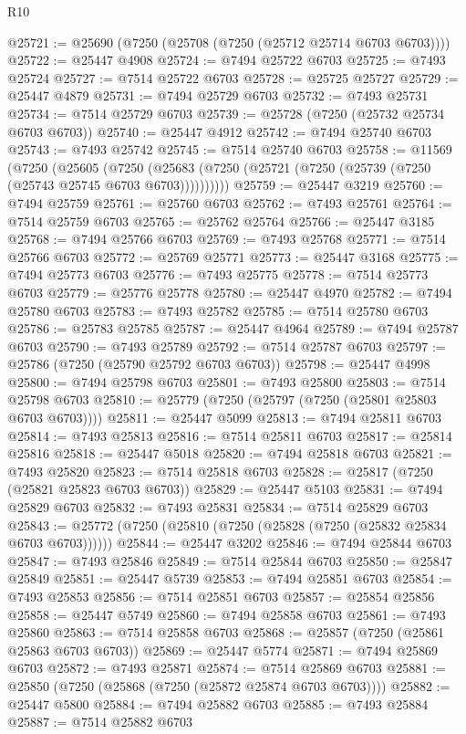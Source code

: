 \begin{lexlean}{R10}
\begin{coremodule}
{{{{{{{{{{{{{{{{{{{{{{{{{{{{{{{{{{{{{{{{{{{{{{{{{{{{{{{{{{{{{{{{{{{{{{{{{{{{{{{{{{{{@25721 := @25690 (@7250 (@25708 (@7250 (@25712 @25714 @6703 @6703))))
@25722 := @25447 @4908
@25724 := @7494 @25722 @6703
@25725 := @7493 @25724
@25727 := @7514 @25722 @6703
@25728 := @25725 @25727
@25729 := @25447 @4879
@25731 := @7494 @25729 @6703
@25732 := @7493 @25731
@25734 := @7514 @25729 @6703
@25739 := @25728 (@7250 (@25732 @25734 @6703 @6703))
@25740 := @25447 @4912
@25742 := @7494 @25740 @6703
@25743 := @7493 @25742
@25745 := @7514 @25740 @6703
@25758 := @11569
    (@7250
      (@25605
        (@7250 (@25683 (@7250 (@25721 (@7250 (@25739 (@7250 (@25743 @25745 @6703 @6703))))))))))
@25759 := @25447 @3219
@25760 := @7494 @25759
@25761 := @25760 @6703
@25762 := @7493 @25761
@25764 := @7514 @25759 @6703
@25765 := @25762 @25764
@25766 := @25447 @3185
@25768 := @7494 @25766 @6703
@25769 := @7493 @25768
@25771 := @7514 @25766 @6703
@25772 := @25769 @25771
@25773 := @25447 @3168
@25775 := @7494 @25773 @6703
@25776 := @7493 @25775
@25778 := @7514 @25773 @6703
@25779 := @25776 @25778
@25780 := @25447 @4970
@25782 := @7494 @25780 @6703
@25783 := @7493 @25782
@25785 := @7514 @25780 @6703
@25786 := @25783 @25785
@25787 := @25447 @4964
@25789 := @7494 @25787 @6703
@25790 := @7493 @25789
@25792 := @7514 @25787 @6703
@25797 := @25786 (@7250 (@25790 @25792 @6703 @6703))
@25798 := @25447 @4998
@25800 := @7494 @25798 @6703
@25801 := @7493 @25800
@25803 := @7514 @25798 @6703
@25810 := @25779 (@7250 (@25797 (@7250 (@25801 @25803 @6703 @6703))))
@25811 := @25447 @5099
@25813 := @7494 @25811 @6703
@25814 := @7493 @25813
@25816 := @7514 @25811 @6703
@25817 := @25814 @25816
@25818 := @25447 @5018
@25820 := @7494 @25818 @6703
@25821 := @7493 @25820
@25823 := @7514 @25818 @6703
@25828 := @25817 (@7250 (@25821 @25823 @6703 @6703))
@25829 := @25447 @5103
@25831 := @7494 @25829 @6703
@25832 := @7493 @25831
@25834 := @7514 @25829 @6703
@25843 := @25772 (@7250 (@25810 (@7250 (@25828 (@7250 (@25832 @25834 @6703 @6703))))))
@25844 := @25447 @3202
@25846 := @7494 @25844 @6703
@25847 := @7493 @25846
@25849 := @7514 @25844 @6703
@25850 := @25847 @25849
@25851 := @25447 @5739
@25853 := @7494 @25851 @6703
@25854 := @7493 @25853
@25856 := @7514 @25851 @6703
@25857 := @25854 @25856
@25858 := @25447 @5749
@25860 := @7494 @25858 @6703
@25861 := @7493 @25860
@25863 := @7514 @25858 @6703
@25868 := @25857 (@7250 (@25861 @25863 @6703 @6703))
@25869 := @25447 @5774
@25871 := @7494 @25869 @6703
@25872 := @7493 @25871
@25874 := @7514 @25869 @6703
@25881 := @25850 (@7250 (@25868 (@7250 (@25872 @25874 @6703 @6703))))
@25882 := @25447 @5800
@25884 := @7494 @25882 @6703
@25885 := @7493 @25884
@25887 := @7514 @25882 @6703
}}}}}}}}}}}}}}}}}}}}}}}}}}}}}}}}}}}}}}}}}}}}}}}}}}}}}}}}}}}}}}}}}}}}}}}}}}}}}}}}}}}}
\end{coremodule}
\end{lexlean}
